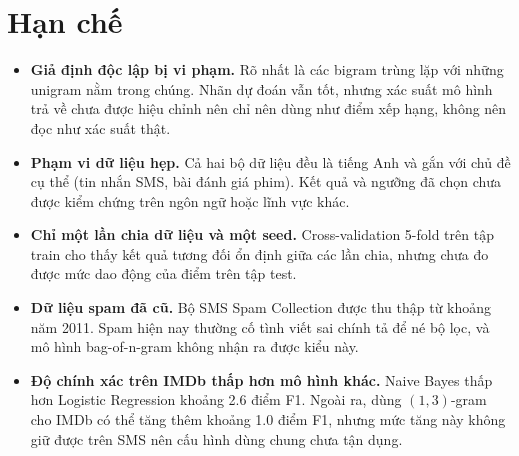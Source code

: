 \documentclass[11pt,a4paper]{article}
\begin{document}
\section{Hạn chế}

\begin{itemize}
\item \textbf{Giả định độc lập bị vi phạm.} Rõ nhất là các bigram trùng lặp với những unigram nằm trong chúng. Nhãn dự đoán vẫn tốt, nhưng xác suất mô hình trả về chưa được hiệu chỉnh nên chỉ nên dùng như điểm xếp hạng, không nên đọc như xác suất thật.
\item \textbf{Phạm vi dữ liệu hẹp.} Cả hai bộ dữ liệu đều là tiếng Anh và gắn với chủ đề cụ thể (tin nhắn SMS, bài đánh giá phim). Kết quả và ngưỡng đã chọn chưa được kiểm chứng trên ngôn ngữ hoặc lĩnh vực khác.
\item \textbf{Chỉ một lần chia dữ liệu và một seed.} Cross-validation 5-fold trên tập train cho thấy kết quả tương đối ổn định giữa các lần chia, nhưng chưa đo được mức dao động của điểm trên tập test.
\item \textbf{Dữ liệu spam đã cũ.} Bộ SMS Spam Collection được thu thập từ khoảng năm 2011. Spam hiện nay thường cố tình viết sai chính tả để né bộ lọc, và mô hình bag-of-n-gram không nhận ra được kiểu này.
\item \textbf{Độ chính xác trên IMDb thấp hơn mô hình khác.} Naive Bayes thấp hơn Logistic Regression khoảng 2.6 điểm F1. Ngoài ra, dùng $(1,3)$-gram cho IMDb có thể tăng thêm khoảng 1.0 điểm F1, nhưng mức tăng này không giữ được trên SMS nên cấu hình dùng chung chưa tận dụng.
\end{itemize}
\end{document}
